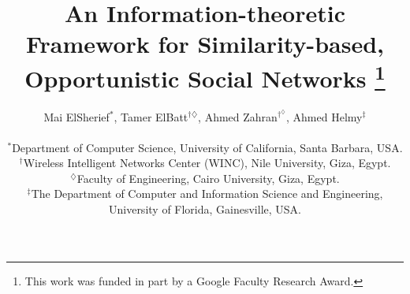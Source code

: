 \documentclass[conference]{IEEEtran}
\date{}
\theoremstyle{definition}
\begin{document}
\title{{\fontsize{20}{20}\selectfont An Information-theoretic Framework for Similarity-based, Opportunistic Social Networks} \thanks{This work was funded in part by a Google Faculty Research Award.}}


\author{\large Mai ElSherief$^*$, Tamer ElBatt$^{\dagger\diamondsuit}$, Ahmed Zahran$^{\dagger^\diamondsuit}$, Ahmed Helmy$^{\ddagger}$  \\ [.1in]
\small  \begin{tabular}{c} 
$^*$Department of Computer Science, University of California, Santa Barbara, USA.\\
$^\dagger$Wireless Intelligent Networks Center (WINC), Nile University, Giza, Egypt.\\
$^\diamondsuit$Faculty of Engineering, Cairo University, Giza, Egypt.\\
$^\ddagger$The Department of Computer and Information Science and Engineering,
University of Florida, Gainesville, USA. \\
\end{tabular} }

\maketitle
\end{document}
